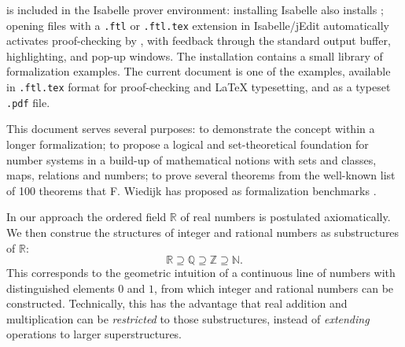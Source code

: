 \documentclass{article}
\begin{document}
\Naproche{} is included in the Isabelle prover environment: installing Isabelle
also installs \Naproche{}; opening files with a \verb+.ftl+ or \verb+.ftl.tex+
extension in Isabelle/jEdit automatically activates proof-checking by \Naproche{},
with feedback through the standard output buffer, highlighting, and
pop-up windows. The \Naproche{} installation contains a small library of
formalization examples. The current document is one of the examples, available
in \verb+.ftl.tex+ format for proof-checking and \LaTeX{} typesetting, and
as a typeset \verb+.pdf+ file.

This document serves several purposes: to demonstrate the
\Naproche{} concept  within a longer formalization;
to propose a logical and set-theoretical foundation for
number systems in a build-up of mathematical notions
with sets and classes, maps, relations and numbers;
to prove several theorems from the well-known list of 100 theorems
that F. Wiedijk has proposed as formalization benchmarks \cite{Wiedijk_100Theorems}.

In our approach the ordered field $\mathbb{R}$ of real numbers
is postulated axiomatically. We then construe the structures of integer and
rational numbers as substructures of $\mathbb{R}$:
\[ \mathbb{R} \supseteq \mathbb{Q} \supseteq \mathbb{Z}
\supseteq \mathbb{N}. \]
This corresponds to the
geometric intuition of a continuous line of numbers with
distinguished elements $0$ and $1$, from which integer and rational numbers can
be constructed. Technically, this has the advantage
that real addition and multiplication
can be {\em restricted} to those substructures, instead of {\em extending} operations
to larger superstructures.
\end{document}
